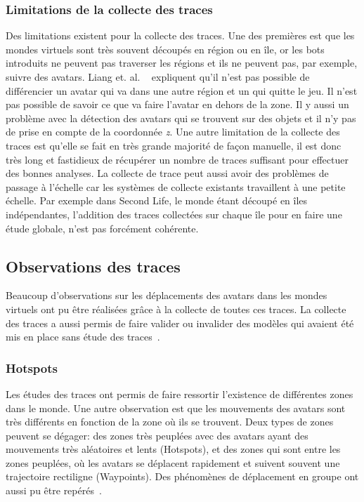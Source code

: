  		\subsubsection{Limitations de la collecte des traces}
	Des limitations existent pour la collecte des traces. Une des premières est que les mondes virtuels sont très souvent découpés en région ou en île, or les bots introduits ne peuvent pas traverser les régions et ils ne peuvent pas, par exemple, suivre des avatars. Liang et. al. ~\cite{DBLP:journals/corr/abs-0807-2328} expliquent qu'il n'est pas possible de différencier un avatar qui va dans une autre région et un qui quitte le jeu. Il n'est pas possible de savoir ce que va faire l'avatar en dehors de la zone. Il y aussi un problème avec la détection des avatars qui se trouvent sur des objets et il n'y pas de prise en compte de la coordonnée \textit{z}. Une autre limitation de la collecte des traces est qu'elle se fait en très grande majorité de façon manuelle, il est donc très long et fastidieux de récupérer un nombre de traces suffisant pour effectuer des bonnes analyses. La collecte de trace peut aussi avoir des problèmes de passage à l'échelle car les systèmes de collecte existants travaillent à une petite échelle. Par exemple dans Second Life, le monde étant découpé en îles indépendantes, l'addition des traces collectées sur chaque île pour en faire une étude globale, n'est pas forcément cohérente.

	\subsection{Observations des traces}
	 Beaucoup d'observations sur les déplacements des avatars dans les mondes virtuels ont pu être réalisées grâce à la collecte de toutes ces traces. La collecte des traces a aussi permis de faire valider ou invalider des modèles qui avaient été mis en place sans étude des traces~\cite{DBLP:journals/corr/abs-0807-2328}. 
		\subsubsection{Hotspots}
	Les études des traces ont permis de faire ressortir l'existence de différentes zones dans le monde. Une autre observation est que les mouvements des avatars sont très différents en fonction de la zone où ils se trouvent. Deux types de zones peuvent se dégager: des zones très peuplées avec des avatars ayant des mouvements très aléatoires et lents (Hotspots), et des zones qui sont entre les zones peuplées, où les avatars se déplacent rapidement et suivent souvent une trajectoire rectiligne (Waypoints). Des phénomènes de déplacement en groupe ont aussi pu être repérés~\cite{15141312}. \\
